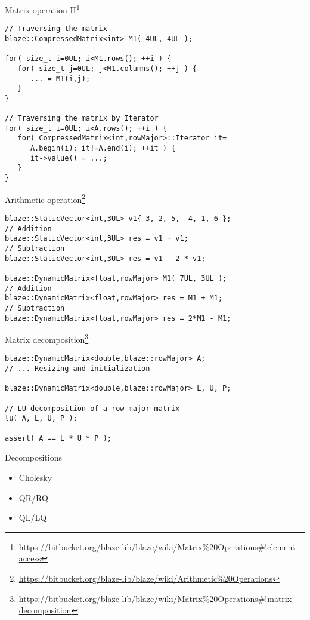 \documentclass[12pt,t]{beamer}
\begin{document}
\begin{frame}[fragile]{Matrix operation II\footnote{\tiny\url{https://bitbucket.org/blaze-lib/blaze/wiki/Matrix\%20Operations\#!element-access}}}
\begin{lstlisting}
// Traversing the matrix 
blaze::CompressedMatrix<int> M1( 4UL, 4UL );

for( size_t i=0UL; i<M1.rows(); ++i ) {
   for( size_t j=0UL; j<M1.columns(); ++j ) {
      ... = M1(i,j);
   }
}

// Traversing the matrix by Iterator
for( size_t i=0UL; i<A.rows(); ++i ) {
   for( CompressedMatrix<int,rowMajor>::Iterator it=
      A.begin(i); it!=A.end(i); ++it ) {
      it->value() = ...;  
   }
}
\end{lstlisting}
\end{frame}

\begin{frame}[fragile]{Arithmetic operation\footnote{\tiny\url{https://bitbucket.org/blaze-lib/blaze/wiki/Arithmetic\%20Operations}}}
\begin{lstlisting}
blaze::StaticVector<int,3UL> v1{ 3, 2, 5, -4, 1, 6 };
// Addition
blaze::StaticVector<int,3UL> res = v1 + v1;
// Subtraction
blaze::StaticVector<int,3UL> res = v1 - 2 * v1;

blaze::DynamicMatrix<float,rowMajor> M1( 7UL, 3UL );
// Addition
blaze::DynamicMatrix<float,rowMajor> res = M1 + M1;
// Subtraction
blaze::DynamicMatrix<float,rowMajor> res = 2*M1 - M1;
\end{lstlisting}
\end{frame}



\begin{frame}[fragile]{Matrix decomposition\footnote{\tiny\url{https://bitbucket.org/blaze-lib/blaze/wiki/Matrix\%20Operations\#!matrix-decomposition}}}
\begin{lstlisting}
blaze::DynamicMatrix<double,blaze::rowMajor> A;
// ... Resizing and initialization

blaze::DynamicMatrix<double,blaze::rowMajor> L, U, P;

// LU decomposition of a row-major matrix
lu( A, L, U, P );  

assert( A == L * U * P );
\end{lstlisting}

\begin{block}{Decompositions}
\begin{itemize}
\item Cholesky 
\item QR/RQ
\item QL/LQ
\end{itemize}
\end{block}

\end{frame}
\end{document}
